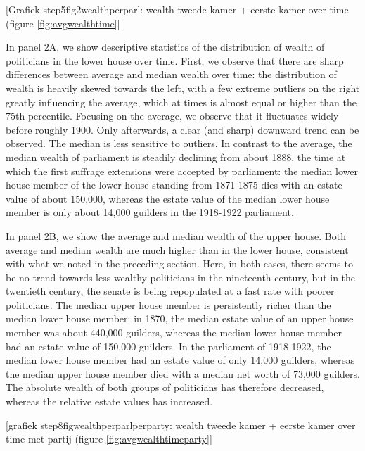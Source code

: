\begin{center}    
    [Grafiek step5fig2wealthperparl: wealth tweede kamer + eerste kamer over time (figure \ref{fig:avgwealthtime}]
 \end{center}
 
    In panel 2A, we show descriptive statistics of the distribution of wealth of politicians in the lower house over time. First, we observe that there are sharp differences between average and median wealth over time: the distribution of wealth is heavily skewed towards the left, with a few extreme outliers on the right greatly influencing the average, which at times is almost equal or higher than the 75th percentile. Focusing on the average, we observe that it fluctuates widely before roughly 1900. Only afterwards, a clear (and sharp) downward trend can be observed. The median is less sensitive to outliers. In contrast to the average, the median wealth of parliament is steadily declining from about 1888, the time at which the first suffrage extensions were accepted by parliament: the median lower house member of the lower house standing from 1871-1875 dies with an estate value of about 150,000, whereas the estate value of the median lower house member is only about 14,000 guilders in the 1918-1922 parliament.
    
    In panel 2B, we show the average and median wealth of the upper house. Both average and median wealth are much higher than in the lower house, consistent with what we noted in the preceding section. Here, in both cases, there seems to be no trend towards less wealthy politicians in the nineteenth century, but in the twentieth century, the senate is being repopulated at a fast rate with poorer politicians. The median upper house member is persistently richer than the median lower house member: in 1870, the median estate value of an upper house member was about 440,000 guilders, whereas the median lower house member had an estate value of 150,000 guilders. In the parliament of 1918-1922, the median lower house member had an estate value of only 14,000 guilders, whereas the median upper house member died with a median net worth of 73,000 guilders. The absolute wealth of both groups of politicians has therefore decreased, whereas the relative estate values has increased. 
    
    \begin{center}
        [grafiek step8figwealthperparlperparty: wealth tweede kamer + eerste kamer over time met partij (figure \ref{fig:avgwealthtimeparty}]
    \end{center}
    
